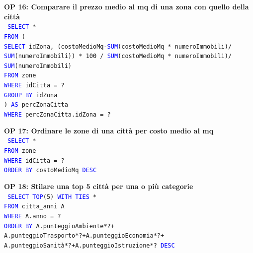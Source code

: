 \documentclass[a4paper,12pt]{report}
\begin{document}
            \newpage
            \noindent
            \textbf{OP 16: Comparare il prezzo medio al mq di una zona con quello della città} \\
            \texttt{
                \textcolor{blue}{SELECT} * \\
                \textcolor{blue}{FROM} (  \\
                \null\qquad\textcolor{blue}{SELECT} idZona, (costoMedioMq-\textcolor{blue}{SUM}(costoMedioMq * numeroImmobili)/ \\
                \null\qquad\textcolor{blue}{SUM}(numeroImmobili)) * 100 / \textcolor{blue}{SUM}(costoMedioMq * numeroImmobili)/ \\
                \null\qquad\textcolor{blue}{SUM}(numeroImmobili) \\
                \null\qquad\textcolor{blue}{FROM} zone \\
                \null\qquad\textcolor{blue}{WHERE} idCitta = ? \\
                \null\qquad\textcolor{blue}{GROUP BY} idZona\\
                ) \textcolor{blue}{AS} percZonaCitta\\
                \textcolor{blue}{WHERE} percZonaCitta.idZona = ? \\
            }

            \noindent
            \textbf{OP 17: Ordinare le zone di una città per costo medio al mq} \\
            \texttt{
                \textcolor{blue}{SELECT} * \\
                \textcolor{blue}{FROM} zone \\
                \textcolor{blue}{WHERE} idCitta = ? \\
                \textcolor{blue}{ORDER BY} costoMedioMq \textcolor{blue}{DESC} \\
            }

            \noindent
            \textbf{OP 18: Stilare una top 5 città per una o più categorie} \\
            \texttt{
                \textcolor{blue}{SELECT TOP}(5) \textcolor{blue}{WITH TIES} * \\
                \textcolor{blue}{FROM} citta\_anni A\\
                \textcolor{blue}{WHERE} A.anno = ? \\
                \textcolor{blue}{ORDER BY} A.punteggioAmbiente*?+ \\
                A.punteggioTrasporto*?+A.punteggioEconomia*?+ \\
                A.punteggioSanità*?+A.punteggioIstruzione*? \textcolor{blue}{DESC} \\
            }
            
\end{document}
